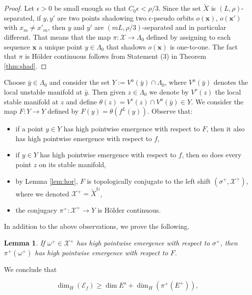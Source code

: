 \documentclass{amsart}
\theoremstyle{plain}
\newtheorem{lem}[thm]{Lemma}
\theoremstyle{definition}
\theoremstyle{remark}
\numberwithin{equation}{section}
\begin{document}
\begin{proof}
Let $\epsilon>0$ be small enough so that $C_0 \epsilon < \rho/3$.  Since the set $\tilde{X}$ is $(L, \rho)$-separated,
if $y,y'$ are two points shadowing two $\epsilon$-pseudo orbits $o(\textbf{x})$, $o(\textbf{x}')$ with $x_m\neq x'_m$, then $y$ and $y'$ are $(mL, \rho/3)$-separated and in particular different.
That means that the map $\pi : \mathcal{X} \to \Lambda_0$ defined by assigning to each sequence $\textbf{x}$ a unique point $y\in \Lambda_0$ that shadows $o(\textbf{x})$ is one-to-one.
The fact that $\pi$ is H\"older continuous follows from Statement (3) in Theorem \ref{thm:shad}.
\end{proof}

Choose $\bar{y}\in\Lambda_0$ and consider the set $ Y:=  V^u(\bar{y})\cap \Lambda_0$, where $V^u(\bar{y})$ denotes the local unstable manifold at $\bar{y}$.
Then given  $z\in \Lambda_0$ we denote by $V^s(z)$ the local stable manifold at $z$ and define $\theta(z)= V^s(z)\cap V^u(\bar{y})  \in Y$. 
We consider the map $F: Y \to Y$ defined by $F(y)= \theta( f^L(y))$.
Observe that: 

\begin{itemize}
\item  if a point $y\in Y$ has high pointwise emergence with respect to $F$, then it also has high pointwise emergence with respect to $f$,

\item if  $y\in Y$ has high pointwise emergence with respect to $f$, then so does every point $z$ on its stable manifold, 

\item by Lemma \ref{lem:hor}, $F$ is topologically conjugate to the left shift $(\sigma^+,\mathcal{X}^+)$, where we denoted  $\mathcal{X^+} = \tilde{X}^{\mathbb{N}}$,

\item the conjugacy $\pi^+ : \mathcal{X^+}  \to Y$  is H\"older continuous.
\end{itemize}

In addition to the above observations, we prove the following.

\begin{lem}\label{lem:1}
If $\omega^+\in \mathcal{X}^+$ has high pointwise emergence with respect to $\sigma^+$, then $\pi^+(\omega^+)$ has high pointwise emergence with respect to $F$.
\end{lem}

We conclude that 

\begin{equation}\label{eqn:low}
\dim_H(\mathcal{E}_f) \geq  \dim E^s  +    \dim_H  (\pi^+(E^+)),
\end{equation}
\end{document}

